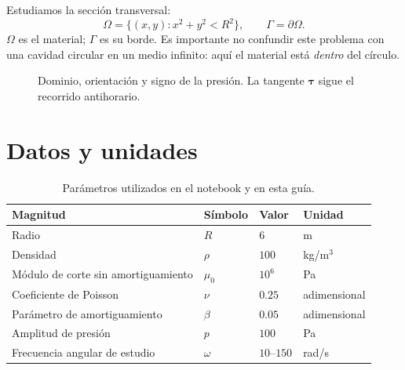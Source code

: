 \documentclass[11pt,a4paper]{report}
\numberwithin{equation}{chapter}
\newcommand{\vect}[1]{\bm{#1}}
\begin{document}
Estudiamos la secci\'on transversal:
\begin{equation}
  \Omega=\{(x,y):x^2+y^2<R^2\},\qquad
  \Gamma=\partial\Omega.
\end{equation}
$\Omega$ es el material; $\Gamma$ es su borde. Es importante no confundir
este problema con una cavidad circular en un medio infinito: aqu\'i el
material est\'a \emph{dentro} del c\'irculo.

\begin{figure}[htbp]
\centering
{}
\caption{Dominio, orientaci\'on y signo de la presi\'on. La tangente
$\vect\tau$ sigue el recorrido antihorario.}
\label{fig:problema}
\end{figure}

\section{Datos y unidades}
\begin{table}[htbp]
\centering
\begin{tabular}{llll}
\toprule
Magnitud & S\'imbolo & Valor & Unidad\\
\midrule
Radio & $R$ & $6$ & m\\
Densidad & $\rho$ & $100$ & kg/m$^3$\\
M\'odulo de corte sin amortiguamiento & $\mu_0$ & $10^6$ & Pa\\
Coeficiente de Poisson & $\nu$ & $0.25$ & adimensional\\
Par\'ametro de amortiguamiento & $\beta$ & $0.05$ & adimensional\\
Amplitud de presi\'on & $p$ & $100$ & Pa\\
Frecuencia angular de estudio & $\omega$ & $10$--$150$ & rad/s\\
\bottomrule
\end{tabular}
\caption{Par\'ametros utilizados en el notebook y en esta gu\'ia.}
\label{tab:parametros}
\end{table}
\end{document}
